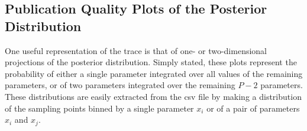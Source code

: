 
\subsection{Publication Quality Plots of the Posterior Distribution}\label{subsec:PublicationQualityPlots}

One useful representation of the trace is that of one- or two-dimensional projections of the posterior distribution. Simply stated, these plots represent the probability of either a single parameter integrated over all values of the remaining parameters, or of two parameters integrated over the remaining $P-2$ parameters. These distributions are easily extracted from the csv file by making a distribution of the sampling points binned by a single parameter $x_i$ or of a pair of parameters $x_i$ and $x_j$.

